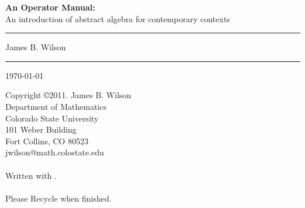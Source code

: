 
\thispagestyle{empty}

{\Huge \noindent \textbf{An Operator Manual:}}\\ 
{\large An introduction of abstract algebra for contemporary contexts}\\

\noindent\rule{\textwidth}{2pt}
\vskip 5in

\begin{flushright}
{\Huge James B. Wilson}\\
\end{flushright}

\noindent\rule{\textwidth}{2pt}
\begin{flushright}
\today
\end{flushright}
\clearpage

\thispagestyle{empty}
\vspace*{2in}

\noindent Copyright \copyright 2011.  James B. Wilson\\
Department of Mathematics\\
Colorado State University\\
101 Weber Building\\
Fort Collins, CO 80523\\

\noindent jwilson@math.colostate.edu\\
\\
Written with \LaTeXe.\\
\\
Please Recycle when finished.\\

\clearpage

